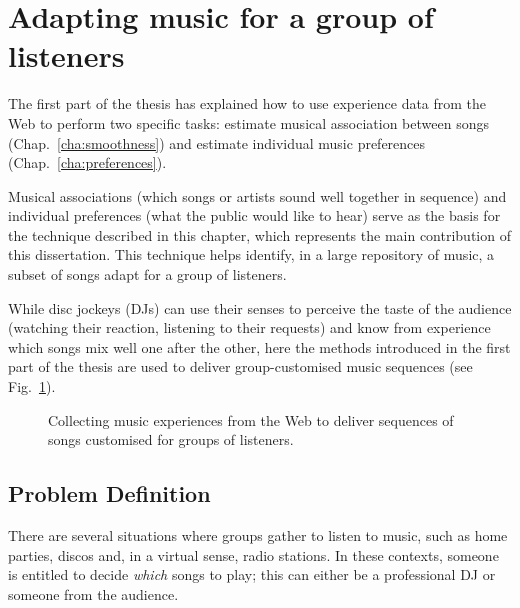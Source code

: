 
\section{Adapting music for a group of listeners} %
\label{sec:adapting_music_for_a_group_of_listeners}

The first part of the thesis has explained how to use experience data from the Web to perform two specific tasks: estimate musical association between songs %
(Chap.~\ref{cha:smoothness}) and estimate individual music preferences %
(Chap.~\ref{cha:preferences}).

Musical associations (which songs or artists sound well together in sequence) and individual preferences (what the public would like to hear) serve as the basis for the technique described in this chapter, which represents the main contribution of this dissertation.
This technique helps identify, in a large repository of music, a subset of songs adapt for a group of listeners.

While disc jockeys (DJs) can use their senses to perceive the taste of the audience (watching their reaction, listening to their requests) and know from experience which songs mix well one after the other, here the methods introduced in the first part of the thesis %
are used to deliver group-customised music sequences (see Fig.~\ref{fig:schema}).
%
\begin{figure}[bthp]
\centering \setlength{\abovecaptionskip}{3pt}
\caption{Collecting music experiences from the Web to deliver sequences of songs customised for groups of listeners.}
\label{fig:schema}
\end{figure}

\subsection{Problem Definition} %
\label{sub:problem_definition2}

There are several situations where groups gather to listen to music, such as home parties, discos and, in a virtual sense, radio stations.
In these contexts, someone is entitled to decide \emph{which} songs to play; this can either be a professional DJ or someone from the audience.

